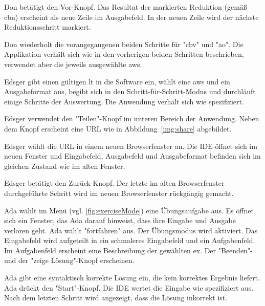 \documentclass[parskip=full,11pt,twoside]{scrartcl}
\begin{document}
{Don betätigt den Vor-Knopf.}
{Das Resultat der markierten Reduktion (gemäß \gls{cbn}) erscheint als neue Zeile im Ausgabefeld.
In der neuen Zeile wird der nächste Reduktionsschritt markiert.}

{Don wiederholt die vorangegangenen beiden Schritte für "\gls{cbv}" und "\gls{ao}".}
{Die Applikation verhält sich wie in den vorherigen beiden Schritten beschrieben,
verwendet aber die jeweils ausgewählte \gls{aws}.}


{Edsger gibt einen gültigen \gls{lt} in die Software ein, wählt eine \gls{aws} und ein
Ausgabeformat aus, begibt sich in den Schritt-für-Schritt-Modus und durchläuft einige
Schritte der Auswertung.}
{Die Anwendung verhält sich wie spezifiziert.}

{Edsger verwendet den "Teilen"-Knopf im unteren Bereich der Anwendung.}
{Neben dem Knopf erscheint eine URL wie in Abbildung~\ref{img:share}
abgebildet.}

{Edsger wählt die URL in einem neuen Browserfenster an.}
{Die IDE öffnet sich im neuen Fenster und Eingabefeld, Ausgabefeld und Ausgabeformat befinden sich im gleichen Zustand wie im alten Fenster.}

{Edsger betätigt den Zurück-Knopf.}
{Der letzte im alten Browserfenster durchgeführte Schritt wird im neuen Browserfenster
rückgängig gemacht.}


{Ada wählt im Menü (vgl. \cref{fig:exerciseMode}) eine Übungsaufgabe aus.}
{Es öffnet sich ein Fenster, das Ada darauf hinweist, dass ihre Eingabe und Ausgabe verloren geht.
 Ada wählt "fortfahren" aus.
 Der Übungsmodus wird aktiviert. 
 Das Eingabefeld wird aufgeteilt in ein schmaleres Eingabefeld und ein Aufgabenfeld.
 Im Aufgabenfeld erscheint eine Beschreibung der gewählten \gls{ex}.
 Der "Beenden"- und der "zeige Lösung"-Knopf erscheinen.}

{Ada gibt eine syntaktisch korrekte Lösung ein, die kein korrektes Ergebnis liefert.
 Ada drückt den "Start"-Knopf.}
{Die IDE wertet die Eingabe wie spezifiziert aus.
 Nach dem letzten Schritt wird angezeigt, dass die Lösung inkorrekt ist.}
\end{document}
